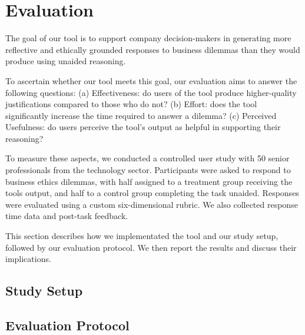 \section{Evaluation}

The goal of our tool is to support company decision-makers in generating more reflective and ethically grounded responses to business dilemmas than they would produce using unaided reasoning.

To ascertain whether our tool meets this goal, our evaluation aims to answer the following questions:
(a) Effectiveness: do users of the tool produce higher-quality justifications compared to those who do not?
(b) Effort: does the tool significantly increase the time required to answer a dilemma?
(c) Perceived Usefulness: do users perceive the tool's output as helpful in supporting their reasoning?

To measure these aspects, we conducted a controlled user study with 50 senior professionals from the technology sector. Participants were asked to respond to business ethics dilemmas, with half assigned to a treatment group receiving the tools output, and half to a control group completing the task unaided. Responses were evaluated using a custom six-dimensional rubric. We also collected response time data and post-task feedback.

This section describes how we implementated the tool and our study setup, followed by our evaluation protocol.
We then report the results and discuss their implications.



\subsection{Study Setup}





\subsection{Evaluation Protocol}







